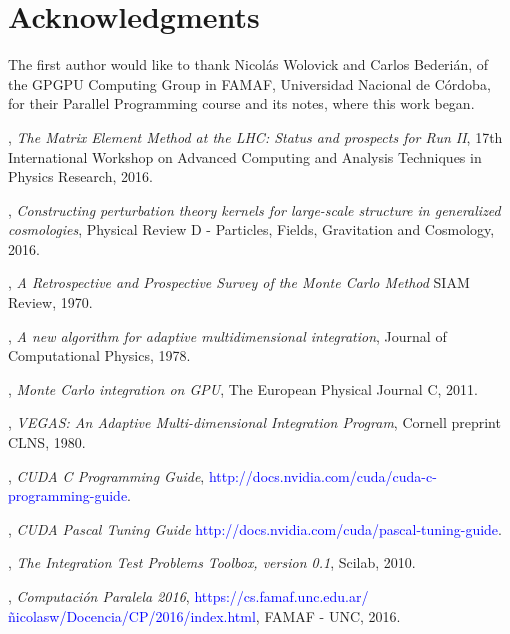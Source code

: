 \documentclass[english]{maciarticle}
\begin{document}
\section*{Acknowledgments}
The first author would like to thank Nicol\'as Wolovick and Carlos Bederi\'an, of the
GPGPU Computing Group in FAMAF, Universidad Nacional de C\'ordoba, for their Parallel Programming course and its notes\cite{cp2016}, where this work began.


\begin{thebibliography}{1}
 {},
\emph{The Matrix Element Method at the LHC: Status and prospects for Run II},
17th International Workshop on Advanced Computing and Analysis Techniques in Physics Research, 2016.

 {},
\emph{Constructing perturbation theory kernels for large-scale structure in generalized cosmologies},
Physical Review D - Particles, Fields, Gravitation and Cosmology, 2016.

 {},
\emph{A Retrospective and Prospective Survey of the Monte Carlo Method}
SIAM Review, 1970.

 {},
\emph{A new algorithm for adaptive multidimensional integration},
Journal of Computational Physics, 1978.

 {},
{\em Monte Carlo integration on GPU},
The European Physical Journal C, 2011.

 {},
{\em VEGAS: An Adaptive Multi-dimensional Integration Program},
Cornell preprint CLNS, 1980.

 {}, {\em CUDA C Programming Guide},
\textcolor{blue}{http://docs.nvidia.com/cuda/cuda-c-programming-guide}.

 {}, {\em CUDA Pascal Tuning Guide} \textcolor{blue}{http://docs.nvidia.com/cuda/pascal-tuning-guide}.

 {},
\emph{The Integration Test Problems Toolbox, version 0.1},
Scilab, 2010.

 {},
{\em Computaci\'on Paralela 2016}, \textcolor{blue}{https://cs.famaf.unc.edu.ar/\~nicolasw/Docencia/CP/2016/index.html},
FAMAF - UNC, 2016.
\end{thebibliography}
\end{document}
